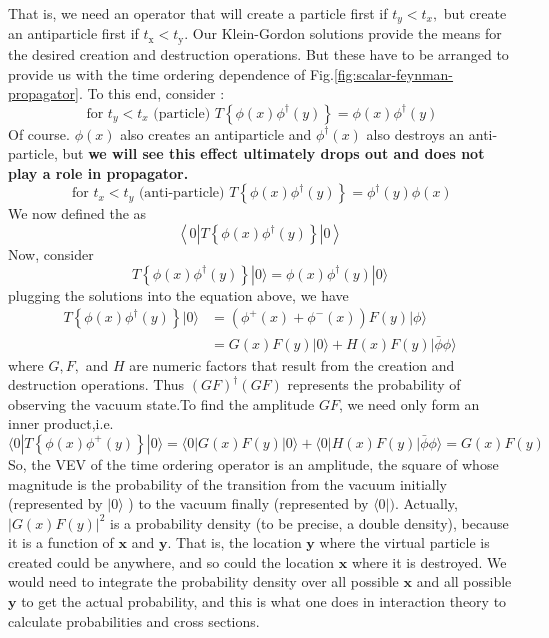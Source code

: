 That is, we need an operator that will create a particle first if $t_{y}<t_{x},$ but create an antiparticle first if $t_{\mathrm{x}}<t_{\mathrm{y}} .$ Our Klein-Gordon solutions provide the means for the desired creation and destruction operations. But these have to be arranged to provide us with the time ordering dependence of Fig.\ref{fig:scalar-feynman-propagator}. To this end, consider :
\begin{equation}
\text { for } t_{y}<t_{x} \text { (particle) } T\left\{\phi(x) \phi^{\dagger}(y)\right\}=\phi(x) \phi^{\dagger}(y)
\end{equation}
Of course.  $\phi(x)$ also creates an antiparticle and $\phi^{\dagger}(x)$ also destroys an anti-particle, but \textbf{we will see this effect ultimately drops out and does not play a role in propagator.}
\begin{equation}
\text { for } t_{x}<t_{y} \text { (anti-particle) } T\left\{\phi(x) \phi^{\dagger}(y)\right\}=\phi^{\dagger}(y) \phi(x)
\end{equation}
We now defined the  as
\begin{equation}
\left\langle 0\left|T\left\{\phi(x) \phi^{\dagger}(y)\right\}\right| 0\right\rangle
\end{equation}
Now, consider
\begin{equation}
T\left\{\phi(x) \phi^{\dagger}(y)\right\}|0\rangle=\phi(x) \phi^{\dagger}(y)|0\rangle
\end{equation}
plugging the solutions into the equation above, we have
\begin{equation}
\begin{aligned}
T\left\{\phi(x) \phi^{\dagger}(y)\right\}|0\rangle&=\left(\phi^{+}(x)+\phi^{-}(x)\right) F(y)|\phi\rangle\\
&=G(x) F(y)|0\rangle+ H(x) F(y)|\bar{\phi} \phi\rangle
\end{aligned}
\end{equation}
where $G,F,$ and $H$ are numeric factors that result from the creation and destruction operations. Thus $(G F)^{\dagger}(G F)$ represents the probability of observing the vacuum state.To find the amplitude $GF$, we need only form an inner product,i.e.
$$
\langle 0| T\left\{\phi(x) \phi^{+}(y)\right\}|0\rangle=\langle 0|G(x) F(y)| 0\rangle+\langle 0|H(x) F(y)| \bar{\phi} \phi\rangle=G(x)F(y)
$$
So, the VEV of the time ordering operator is an amplitude, the square of whose magnitude is the probability of the transition from the vacuum initially (represented by $|0\rangle$ ) to the vacuum finally (represented by $\langle 0|) .$ Actually, $|G(x) F(y)|^{2}$ is a probability density (to be precise, a double density), because it is a function of $\mathbf{x}$ and $\mathbf{y} .$ That is, the location $\mathbf{y}$ where the virtual particle is created could be anywhere, and so could the location $\mathbf{x}$ where it is destroyed. We would need to integrate the probability density over all possible $\mathbf{x}$ and all possible $\mathbf{y}$ to get the actual probability, and this is what one does in interaction theory to calculate probabilities and cross sections.

